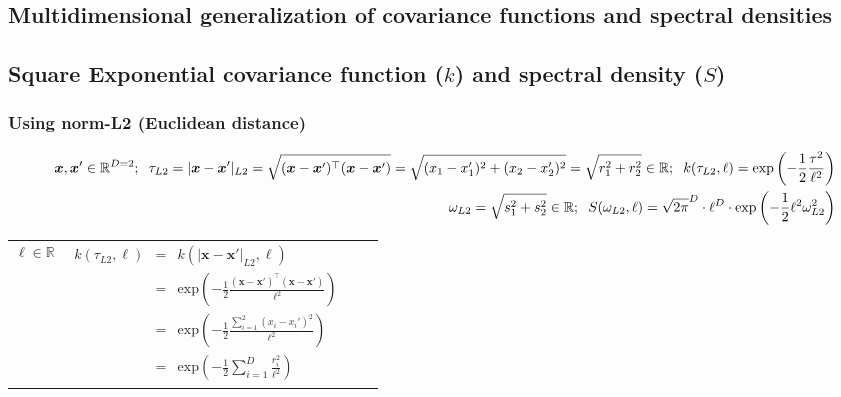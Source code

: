 \documentclass[]{interact}
\theoremstyle{plain}%
\theoremstyle{definition}
\theoremstyle{remark}
\begin{document}
\newpage
\begin{landscape}

\section{Multidimensional generalization of covariance functions and spectral densities}

\subsection{Square Exponential covariance function ($k$) \textbf and spectral density ($S$)}
\vspace{-2mm}
\subsubsection{Using norm-L2 (Euclidean distance)}
\vspace{-10mm}

\begin{table}[H]
\small
\begin{eqnarray*}
\vspace{-20mm}
&&\bm{x}, \bm{x}' \in \mathbb{R}^{D=2}; \hspace{2mm}\tau_{L2} =|\bm{x}-\bm{x}'|_{L2} = \sqrt{(\bm{x}-\bm{x}')^\top(\bm{x}-\bm{x}')} = \sqrt{(x_1-x_1')^2+(x_2-x_2')^2}  = \sqrt{r_1^2+r_2^2} \in \mathbb{R}; \hspace{2mm} k(\tau_{L2},\ell) = \mathrm{exp}\left(-\frac{1}{2} \frac{\tau^2}{\ell^2} \right)\\
&& \omega_{L2}= \sqrt{s_1^2+s_2^2} \in \mathbb{R}; \hspace{2mm} S(\omega_{L2},\ell) = \sqrt{2\pi}^D \cdot \ell^D \cdot \mathrm{exp}\left(-\frac{1}{2} \ell^2 \omega_{L2}^2 \right)
\end{eqnarray*}
\normalsize
  \begin{center}
    \begin{tabular}{|c|c|c|c|}
       \hline
       
       \multicolumn{1}{|p{1.5cm}|}{
       \vspace{1mm}
       $\ell \in \mathbb{R}$
       }
       
        & \multicolumn{1}{|p{7.2cm}|}{\small
         \begin{eqnarray*}
		k(\tau_{L2},\ell) &=& k(|\bm{x}-\bm{x}'|_{L2},\ell)\\
		 &=& \mathrm{exp}\left(-\frac{1}{2} \frac{(\bm{x}-\bm{x}')^\top(\bm{x}-\bm{x}')}{\ell^2} \right)\\
		&=& \mathrm{exp}\left(-\frac{1}{2} \frac{\sum_{i=1}^{2}(x_i-x_i')^2}{\ell^2} \right) \\
		&=& \mathrm{exp}\left(-\frac{1}{2} \sum_{i=1}^{D}\frac{r_i^2}{\ell^2} \right)
         \end{eqnarray*}
       }
       

\end{tabular}
\end{center}
\end{table}
\end{landscape}
\end{document}

